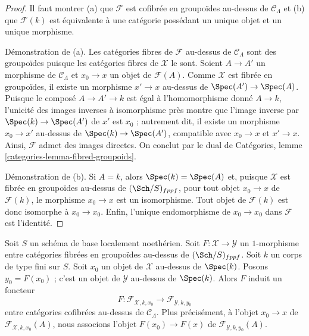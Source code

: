 \begin{proof}
Il faut montrer (a) que $\mathcal{F}$ est cofibrée en groupoïdes au-dessus de
$\mathcal{C}_\Lambda$ et (b) que $\mathcal{F}(k)$ est équivalente à une
catégorie possédant un unique objet et un unique morphisme.

\medskip\noindent
Démonstration de (a). Les catégories fibres de $\mathcal{F}$
au-dessus de $\mathcal{C}_\Lambda$ sont des groupoïdes puisque les catégories fibres
de $\mathcal{X}$ le sont. Soient $A \to A'$ un morphisme de
$\mathcal{C}_\Lambda$ et $x_0 \to x$ un objet de $\mathcal{F}(A)$.
Comme $\mathcal{X}$ est fibrée en groupoïdes, il existe un morphisme
$x' \to x$ au-dessus de $\Spec(A') \to \Spec(A)$. Puisque le composé
$A \to A' \to k$ est égal à l'homomorphisme donné $A \to k$, l'unicité
des images inverses à isomorphisme près montre que l'image inverse par $\Spec(k) \to \Spec(A')$
de $x'$ est $x_0$ ; autrement dit, il existe un morphisme $x_0 \to x'$
au-dessus de $\Spec(k) \to \Spec(A')$, compatible avec
$x_0 \to x$ et $x' \to x$. Ainsi, $\mathcal{F}$ admet des
images directes. On conclut par le dual de
Catégories, lemme \ref{categories-lemma-fibred-groupoids}.

\medskip\noindent
Démonstration de (b). Si $A = k$, alors $\Spec(k) = \Spec(A)$ et, puisque $\mathcal{X}$
est fibrée en groupoïdes au-dessus de $(\Sch/S)_{fppf}$, pour tout objet
$x_0 \to x$ de $\mathcal{F}(k)$, le morphisme $x_0 \to x$ est un isomorphisme.
Tout objet de $\mathcal{F}(k)$ est donc isomorphe à $x_0 \to x_0$.
Enfin, l'unique endomorphisme de $x_0 \to x_0$ dans $\mathcal{F}$ est
l'identité.
\end{proof}

\noindent
Soit $S$ un schéma de base localement noethérien. Soit
$F : \mathcal{X} \to \mathcal{Y}$ un $1$-morphisme entre catégories
fibrées en groupoïdes au-dessus de $(\Sch/S)_{fppf}$. Soit $k$ un corps
de type fini sur $S$. Soit $x_0$ un objet de $\mathcal{X}$ au-dessus
de $\Spec(k)$. Posons $y_0 = F(x_0)$ ; c'est un objet de $\mathcal{Y}$
au-dessus de $\Spec(k)$. Alors $F$ induit un foncteur
\begin{equation}
\label{equation-functoriality}
F :
\mathcal{F}_{\mathcal{X}, k, x_0}
\longrightarrow
\mathcal{F}_{\mathcal{Y}, k, y_0}
\end{equation}
entre catégories cofibrées au-dessus de $\mathcal{C}_\Lambda$. Plus précisément, à l'objet
$x_0 \to x$ de $\mathcal{F}_{\mathcal{X}, k, x_0}(A)$, nous associons
l'objet $F(x_0) \to F(x)$ de $\mathcal{F}_{\mathcal{Y}, k, y_0}(A)$.


